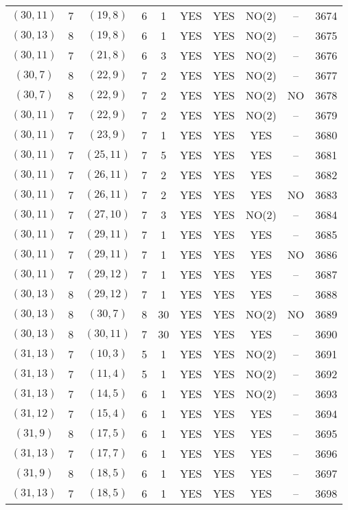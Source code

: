 \begin{longtable}{|c|c|c|c|c|c|c|c|c|c|}
$(30, 11)$ & 7 & $(19, 8)$ & 6 & 1 & YES & YES & NO(2) & -- & 3674\\
$(30, 13)$ & 8 & $(19, 8)$ & 6 & 1 & YES & YES & NO(2) & -- & 3675\\
$(30, 11)$ & 7 & $(21, 8)$ & 6 & 3 & YES & YES & NO(2) & -- & 3676\\
$(30, 7)$ & 8 & $(22, 9)$ & 7 & 2 & YES & YES & NO(2) & -- & 3677\\
$(30, 7)$ & 8 & $(22, 9)$ & 7 & 2 & YES & YES & NO(2) & NO & 3678\\
$(30, 11)$ & 7 & $(22, 9)$ & 7 & 2 & YES & YES & NO(2) & -- & 3679\\
$(30, 11)$ & 7 & $(23, 9)$ & 7 & 1 & YES & YES & YES & -- & 3680\\
$(30, 11)$ & 7 & $(25, 11)$ & 7 & 5 & YES & YES & YES & -- & 3681\\
$(30, 11)$ & 7 & $(26, 11)$ & 7 & 2 & YES & YES & YES & -- & 3682\\
$(30, 11)$ & 7 & $(26, 11)$ & 7 & 2 & YES & YES & YES & NO & 3683\\
$(30, 11)$ & 7 & $(27, 10)$ & 7 & 3 & YES & YES & NO(2) & -- & 3684\\
$(30, 11)$ & 7 & $(29, 11)$ & 7 & 1 & YES & YES & YES & -- & 3685\\
$(30, 11)$ & 7 & $(29, 11)$ & 7 & 1 & YES & YES & YES & NO & 3686\\
$(30, 11)$ & 7 & $(29, 12)$ & 7 & 1 & YES & YES & YES & -- & 3687\\
$(30, 13)$ & 8 & $(29, 12)$ & 7 & 1 & YES & YES & YES & -- & 3688\\
$(30, 13)$ & 8 & $(30, 7)$ & 8 & 30 & YES & YES & NO(2) & NO & 3689\\
$(30, 13)$ & 8 & $(30, 11)$ & 7 & 30 & YES & YES & YES & -- & 3690\\
$(31, 13)$ & 7 & $(10, 3)$ & 5 & 1 & YES & YES & NO(2) & -- & 3691\\
$(31, 13)$ & 7 & $(11, 4)$ & 5 & 1 & YES & YES & NO(2) & -- & 3692\\
$(31, 13)$ & 7 & $(14, 5)$ & 6 & 1 & YES & YES & NO(2) & -- & 3693\\
$(31, 12)$ & 7 & $(15, 4)$ & 6 & 1 & YES & YES & YES & -- & 3694\\
$(31, 9)$ & 8 & $(17, 5)$ & 6 & 1 & YES & YES & YES & -- & 3695\\
$(31, 13)$ & 7 & $(17, 7)$ & 6 & 1 & YES & YES & YES & -- & 3696\\
$(31, 9)$ & 8 & $(18, 5)$ & 6 & 1 & YES & YES & YES & -- & 3697\\
$(31, 13)$ & 7 & $(18, 5)$ & 6 & 1 & YES & YES & YES & -- & 3698\\

\end{longtable}
